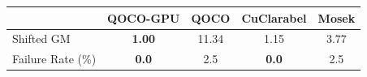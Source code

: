 \begin{tabular}{lcccc}
\toprule
 & QOCO-GPU & QOCO & CuClarabel & Mosek \\
\midrule
Shifted GM & \textbf{1.00} & 11.34 & 1.15 & 3.77 \\
Failure Rate (\%) & \textbf{0.0} & 2.5 & \textbf{0.0} & 2.5 \\
\bottomrule
\end{tabular}